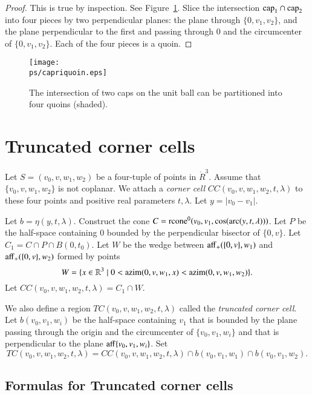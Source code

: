 \begin{proof} This is true by inspection.  See Figure~\ref{fig:capriquoin}.
Slice the intersection ${\operatorname{cap}}_1\cap{\operatorname{cap}}_2$ into four pieces
by two perpendicular planes: the plane through $\{0,v_1,v_2\}$,
and the plane perpendicular to the first and passing through $0$
and the circumcenter of $\{0,v_1,v_2\}$.  Each of the four pieces
is a quoin.
\end{proof}

\begin{figure}[htb]
  \centering
  \texttt{[image: \\ps/capriquoin.eps]}
  \caption{The intersection of two caps on the unit ball can
   be partitioned into four quoins (shaded).}
  \label{fig:capriquoin}
\end{figure}


\section{Truncated corner cells}\label{sec:tcc}

Let $S=(v_0,v,w_1,w_2)$ be a four-tuple of points in $\ring{R}^3$.  Assume
that $\{v_0,v,w_1,w_2\}$ is not coplanar.
We
attach a {\it corner cell} $CC(v_0,v,w_1,w_2,t,\lambda)$
to these four points and positive
real parameters $t,\lambda$.  Let $y=|v_0-v_1|$.  

Let $b=\eta(y,t,\lambda)$.
Construct the cone $C={\operatorname{rcone}}^0(v_0,v_1,\cos(\operatorname{arc}(y,t,\lambda)))$.
Let $P$ be the half-space containing $0$ bounded by
the perpendicular bisector of  $\{0,v\}$.
Let $C_1 = C\cap P \cap B(0,t_0)$.
Let $W$ be the wedge between ${\operatorname{aff}}_+(\{0,v\},w_1)$ and
${\operatorname{aff}}_+(\{0,v\},w_2)$ formed by points 
   $$W = \{x\in\mathbb{R}^3 \mid 0< {\operatorname{azim}}(0,v,w_1,x) <
     {\operatorname{azim}}(0,v,w_1,w_2)\}.$$
Let $CC(v_0,v,w_1,w_2,t,\lambda) = C_1 \cap W$.

We also define a region $TC(v_0,v,w_1,w_2,t,\lambda)$ called
the {\it truncated corner cell}.  Let $b(v_0,v_1,w_i)$ be the
half-space containing $v_1$ that is bounded by the
plane passing through the origin and the
circumcenter of $\{v_0,v_1,w_i\}$ and that is perpendicular to the
plane ${\operatorname{aff}}\{v_0,v_1,w_i\}$.  Set
  $$TC(v_0,v,w_1,w_2,t,\lambda) = CC(v_0,v,w_1,w_2,t,\lambda)
    \cap b(v_0,v_1,w_1)\cap b(v_0,v_1,w_2).$$ 


\subsection{Formulas for Truncated corner cells}\label{sec:ftcc}

